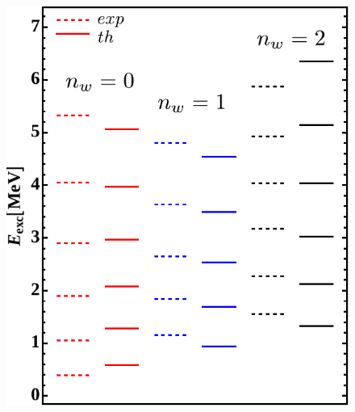 \documentclass{beamer}
\begin{document}
\begin{frame}
\begin{figure}
    \includegraphics[scale=0.44]{Figs/136Nd-excitation-higher-edited.pdf}
  \end{figure}

\end{frame}

\end{document}
